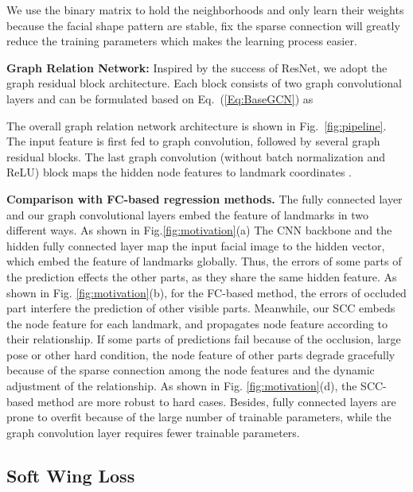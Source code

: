 \documentclass[runningheads]{llncs}
\begin{document}
We use the binary matrix  to hold the neighborhoods and only learn their weights because the facial shape pattern are stable, 
fix the sparse connection will greatly reduce the training parameters which makes the learning process easier.

 








\textbf{Graph Relation Network:}
Inspired by the success of ResNet\cite{ResNet}, we adopt the graph residual block architecture. Each block consists of two graph convolutional layers and can be formulated based on Eq.~(\ref{Eq:BaseGCN}) as

The overall graph relation network architecture is shown in Fig.~\ref{fig:pipeline}.
The input feature  is first fed to graph convolution, followed by several graph residual blocks. 
The last graph convolution (without batch normalization and ReLU) block maps the hidden node features to landmark coordinates . 


\textbf{Comparison with FC-based regression methods.} 
The fully connected layer and our graph convolutional layers embed the feature of landmarks in two different ways.
As shown in Fig.\ref{fig:motivation}(a) The CNN backbone and the hidden fully connected layer map the input facial image to the hidden vector,
 which embed the feature of landmarks globally.
Thus, the errors of some parts of the prediction effects the other parts, as they share the same hidden feature.
As shown in Fig. \ref{fig:motivation}(b), for the FC-based method, the errors of occluded part interfere the prediction of other visible parts.
Meanwhile, our SCC embeds the node feature for each landmark, and propagates node feature according to their relationship.
If some parts of predictions fail because of the occlusion, large pose or other hard condition, the node feature of other parts degrade gracefully because of the sparse connection among the node features and the dynamic adjustment of the relationship.   
As shown in Fig. \ref{fig:motivation}(d), the SCC-based method are more robust to hard cases. 
Besides, fully connected layers are prone to overfit because of the large number of trainable parameters, while the graph convolution layer requires fewer trainable parameters.



\subsection{Soft Wing Loss}
\label{sec:softwing}
\end{document}
